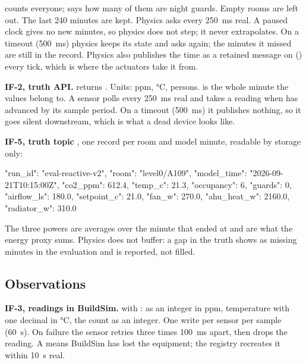  counts everyone;  says how many of them are night
guards. Empty rooms are left out. The last 240 minutes are kept. Physics asks
every 250~ms real. A paused clock gives no new minutes, so physics does not
step; it never extrapolates. On a timeout (500~ms) physics keeps its state and
asks again; the minutes it missed are still in the record. Physics also
publishes the time as a retained message on 
() every tick, which is where the
actuators take it from.

\textbf{IF-2, truth API.} 
returns . Units: ppm, °C,
persons.  is the whole minute the values belong to. A sensor
polls every 250~ms real and takes a reading when  has
advanced by its sample period. On a timeout (500~ms) it publishes nothing, so
it goes silent downstream, which is what a dead device looks like.

\textbf{IF-5, truth topic} , one record per room and
model minute, readable by storage only:

\begin{json}
{"run_id": "eval-reactive-v2", "room": "level0/A109",
 "model_time": "2026-09-21T10:15:00Z",
 "co2_ppm": 612.4, "temp_c": 21.3, "occupancy": 6, "guards": 0,
 "airflow_ls": 180.0, "setpoint_c": 21.0,
 "fan_w": 270.0, "ahu_heat_w": 2160.0, "radiator_w": 310.0}
\end{json}

The three powers are averages over the minute that ended at 
and are what the energy proxy sums. Physics does not buffer: a gap in the truth
shows as missing minutes in the evaluation and is reported, not filled.

\subsection{Observations}

\textbf{IF-3, readings in BuildSim.}
 with
: \COtwo{} as an integer in ppm,
temperature with one decimal in °C, the count as an integer. One write per
sensor per sample (60~s). On failure the sensor retries three times 100~ms
apart, then drops the reading. A  means BuildSim has lost the
equipment; the registry recreates it within 10~s real.

